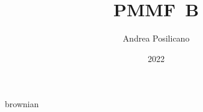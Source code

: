\documentclass[a4paper]	{report}
\title	{PMMF~B}
\author	{Andrea Posilicano}
\date	{2022}
\begin{document}
\maketitle
	{brownian}
\end{document}
